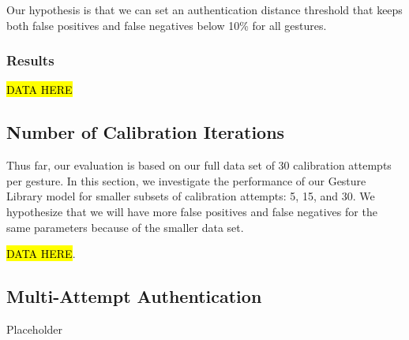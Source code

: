 Our hypothesis is that we can set an authentication distance threshold that keeps both false positives and false negatives below 10\% for all gestures.

\subsubsection{Results}

\hl{DATA HERE}

\subsection{Number of Calibration Iterations}

Thus far, our evaluation is based on our full data set of 30 calibration attempts per gesture. In this section, we investigate the performance of our Gesture Library model for smaller subsets of calibration attempts: 5, 15, and 30. We hypothesize that we will have more false positives and false negatives for the same parameters because of the smaller data set.

\hl{DATA HERE}.

\subsection{Multi-Attempt Authentication}

Placeholder

 

